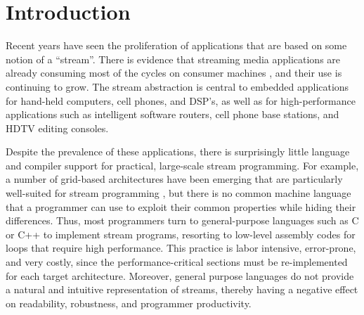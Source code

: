 \section{Introduction}

Recent years have seen the proliferation of applications that are
based on some notion of a ``stream''.  There is evidence that
streaming media applications are already consuming most of the cycles
on consumer machines \cite{Rix98}, and their use is continuing to
grow.  The stream abstraction is central to embedded applications for
hand-held computers, cell phones, and DSP's, as well as for
high-performance applications such as intelligent software routers,
cell phone base stations, and HDTV editing consoles.

Despite the prevalence of these applications, there is surprisingly
little language and compiler support for practical, large-scale stream
programming.  For example, a number of grid-based architectures have
been emerging that are particularly well-suited for stream programming
\cite{raw, smartmemories, trips}, but there is no common machine
language that a programmer can use to exploit their common properties
while hiding their differences.  Thus, most programmers turn to
general-purpose languages such as C or C++ to implement stream
programs, resorting to low-level assembly codes for loops that require
high performance.  This practice is labor intensive, error-prone, and
very costly, since the performance-critical sections must be
re-implemented for each target architecture.  Moreover, general
purpose languages do not provide a natural and intuitive
representation of streams, thereby having a negative effect on
readability, robustness, and programmer productivity.

